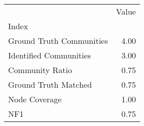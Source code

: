 \begin{tabular}{lr}
\toprule
{} &  Value \\
Index                    &        \\
\midrule
Ground Truth Communities &   4.00 \\
Identified Communities   &   3.00 \\
Community Ratio          &   0.75 \\
Ground Truth Matched     &   0.75 \\
Node Coverage            &   1.00 \\
NF1                      &   0.75 \\
\bottomrule
\end{tabular}
